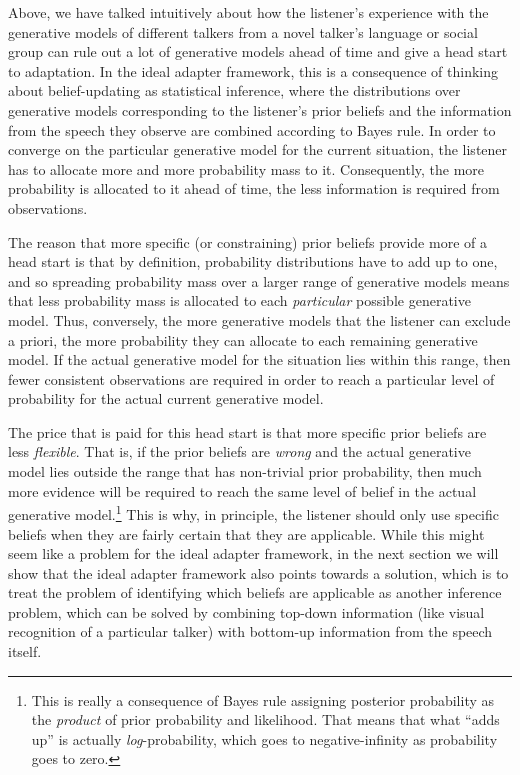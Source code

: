 Above, we have talked intuitively about how the listener's experience with the generative models of different talkers from a novel talker's language or social group can rule out a lot of generative models ahead of time and give a head start to adaptation.  In the ideal adapter framework, this is a consequence of thinking about belief-updating as statistical inference, where the distributions over generative models corresponding to the listener's prior beliefs and the information from the speech they observe are combined according to Bayes rule.  In order to converge on the particular generative model for the current situation, the listener has to allocate more and more probability mass to it.  Consequently, the more probability is allocated to it ahead of time, the less information is required from observations.  

The reason that more specific (or constraining) prior beliefs provide more of a head start is that by definition, probability distributions have to add up to one, and so spreading probability mass over a larger range of generative models means that less probability mass is allocated to each \emph{particular} possible generative model.  Thus, conversely, the more generative models that the listener can exclude a priori, the more probability they can allocate to each remaining generative model.  If the actual generative model for the situation lies within this range, then fewer consistent observations are required in order to reach a particular level of probability for the actual current generative model.  

The price that is paid for this head start is that more specific prior beliefs are less \emph{flexible}.  That is, if the prior beliefs are \emph{wrong} and the actual generative model lies outside the range that has non-trivial  prior probability, then much more evidence will be required to reach the same level of belief in the actual generative model.\footnote{This is really a consequence of Bayes rule assigning posterior probability as the \emph{product} of prior probability and likelihood.  That means that what ``adds up'' is actually \emph{log}-probability, which goes to negative-infinity as probability goes to zero.}  This is why, in principle, the listener should only use specific beliefs when they are fairly certain that they are applicable.  While this might seem like a problem for the ideal adapter framework, in the next section we will show that the ideal adapter framework also points towards a solution, which is to treat the problem of identifying which beliefs are applicable as another inference problem, which can be solved by combining top-down information (like visual recognition of a particular talker) with bottom-up information from the speech itself.

